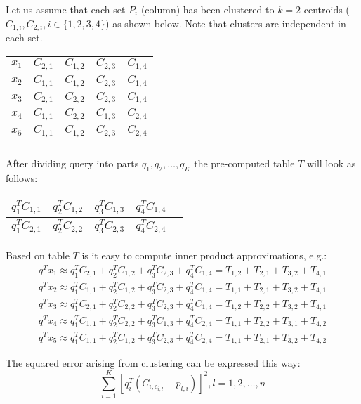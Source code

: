 \smallskip

Let us assume that each set $P_i$ (column) has been clustered to $k=2$ centroids ($C_{1,i}, C_{2,i}, i \in \{1,2,3,4\}$) as shown below. Note that clusters are independent in each set.
\begin{center}
\renewcommand{\arraystretch}{1.2}
\begin{tabular}{c|c|c|c|c|}
\hhline{~----}
$x_1$ & $C_{2,1}$ & $C_{1,2}$ & $C_{2,3}$ & $C_{1,4}$ \\
\hhline{~----}
$x_2$ & $C_{1,1}$ & $C_{1,2}$ & $C_{2,3}$ & $C_{1,4}$ \\
\hhline{~----}
$x_3$ & $C_{2,1}$ & $C_{2,2}$ & $C_{2,3}$ & $C_{1,4}$ \\
\hhline{~----}
$x_4$ & $C_{1,1}$ & $C_{2,2}$ & $C_{1,3}$ & $C_{2,4}$ \\
\hhline{~----}
$x_5$ & $C_{1,1}$ & $C_{1,2}$ & $C_{2,3}$ & $C_{2,4}$ \\
\hhline{~----}
\end{tabular}
\end{center}

\smallskip

After dividing query into parts $q_1, q_2, \ldots, q_K$ the pre-computed table $T$ will look as follows:
\renewcommand{\arraystretch}{1.6}
\begin{center}
\begin{tabular}{|c|c|c|c|c|}
\hline
$ q_1^T C_{1,1} $ & $ q_2^T C_{1,2} $ & $ q_3^T C_{1,3} $ & $ q_4^T C_{1,4} $\\
\hline
$ q_1^T C_{2,1} $ & $ q_2^T C_{2,2} $ & $ q_3^T C_{2,3} $ & $ q_4^T C_{2,4} $\\
\hline
\end{tabular}
\end{center}

\smallskip

Based on table $T$ is it easy to compute inner product approximations, e.g.:
\begin{gather*}
 q^T x_1 \approx q_1^T C_{2,1} + q_2^T C_{1,2} + q_3^T C_{2,3} + q_4^T C_{1,4} = T_{1,2} + T_{2,1} + T_{3,2} + T_{4,1} \\
 q^T x_2 \approx q_1^T C_{1,1} + q_2^T C_{1,2} + q_3^T C_{2,3} + q_4^T C_{1,4} = T_{1,1} + T_{2,1} + T_{3,2} + T_{4,1} \\
 q^T x_3 \approx q_1^T C_{2,1} + q_2^T C_{2,2} + q_3^T C_{2,3} + q_4^T C_{1,4} = T_{1,2} + T_{2,2} + T_{3,2} + T_{4,1} \\
 q^T x_4 \approx q_1^T C_{1,1} + q_2^T C_{2,2} + q_3^T C_{1,3} + q_4^T C_{2,4} = T_{1,1} + T_{2,2} + T_{3,1} + T_{4,2} \\
 q^T x_5 \approx q_1^T C_{1,1} + q_2^T C_{1,2} + q_3^T C_{2,3} + q_4^T C_{2,4} = T_{1,1} + T_{2,1} + T_{3,2} + T_{4,2}
\end{gather*}

The squared error arising from clustering can be expressed this way:
$$ \sum_{i=1}^{K}  [q_{i}^{T} (C_{i, c_{i,l}} - p_{l,i})]^2, l = 1, 2, \ldots, n$$
